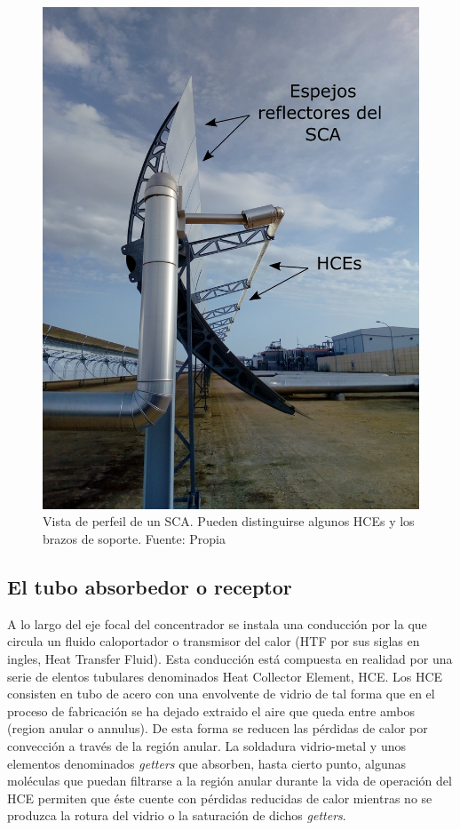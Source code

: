 \begin{figure}
\includegraphics[width=0.9\linewidth]{images/perfil_sca_2_texto.png}
\caption{Vista de perfeil de un SCA. Pueden distinguirse algunos HCEs y los brazos de soporte. Fuente: Propia} 
\label{fig:perfil_sca}
\end{figure}

\subsection{El tubo absorbedor o receptor}
\label{tuboabsorbedor}
A lo largo del eje focal del concentrador se instala una conducción por la que circula un fluido caloportador o transmisor del calor (HTF por sus siglas en ingles, Heat Transfer Fluid). Esta conducción está compuesta en realidad por una serie de elentos tubulares denominados Heat Collector Element, HCE. Los HCE consisten en tubo de acero con una envolvente de vidrio de tal forma que en el proceso de fabricación se ha dejado extraido el aire que queda entre ambos (region anular o annulus). De esta forma se reducen las pérdidas de calor por convección a través de la región anular. La soldadura vidrio-metal y unos elementos denominados \textit{getters} que absorben, hasta cierto punto, algunas moléculas que puedan filtrarse a la región anular durante la vida de operación del HCE permiten que éste cuente con pérdidas reducidas de calor mientras no se produzca la rotura del vidrio o la saturación de dichos \textit{getters}. 

